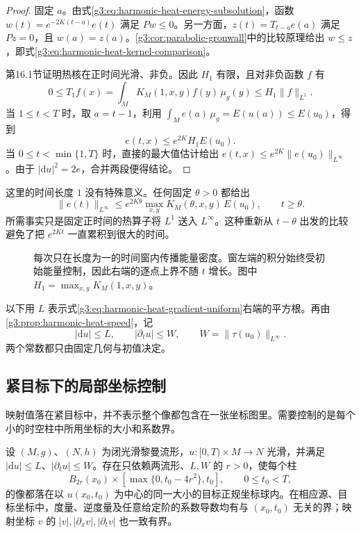 \begin{proof}
	固定 \(a\)。由式\eqref{g3:eq:harmonic-heat-energy-subsolution}，函数 \(w(t)=e^{-2K(t-a)}e(t)\) 满足 \(Pw\le0\)。另一方面，\(z(t)=T_{t-a}e(a)\) 满足 \(Pz=0\)，且 \(w(a)=z(a)\)。\cref{g3:cor:parabolic-gronwall}中的比较原理给出 \(w\le z\)，即式\eqref{g3:eq:harmonic-heat-kernel-comparison}。

	第16.1节证明热核在正时间光滑、非负。因此 \(H_1\) 有限，且对非负函数 \(f\) 有
	\[
		0\le T_1f(x)=\int_MK_M(1,x,y)f(y)\,\mu_g(y)
		\le H_1\|f\|_{L^1}.
	\]
	当 \(1\le t<T\) 时，取 \(a=t-1\)，利用 \(\int_M e(a)\,\mu_g=E(u(a))\le E(u_0)\)，得到
	\[
		e(t,x)\le e^{2K}H_1E(u_0).
	\]
	当 \(0\le t<\min\{1,T\}\) 时，直接的最大值估计给出 \(e(t,x)\le e^{2K}\|e(u_0)\|_{L^\infty}\)。由于 \(|\mathrm du|^2=2e\)，合并两段便得结论。
\end{proof}

这里的时间长度 \(1\) 没有特殊意义。任何固定 \(\theta>0\) 都给出
\[
	\|e(t)\|_{L^\infty}\le e^{2K\theta}
	\max_{x,y}K_M(\theta,x,y)\,E(u_0),\qquad t\ge\theta.
\]
所需事实只是固定正时间的热算子将 \(L^1\) 送入 \(L^\infty\)。这种重新从 \(t-\theta\) 出发的比较避免了把 \(e^{2Kt}\) 一直累积到很大的时间。

\begin{figure}[htbp]
	\centering
	
	\caption[固定时间窗内的热核比较]{每次只在长度为一的时间窗内传播能量密度。窗左端的积分始终受初始能量控制，因此右端的逐点上界不随 \(t\) 增长。图中 \(H_1=\max_{x,y}K_M(1,x,y)\)。}
	\label{g3:fig:harmonic-heat-fixed-window}
\end{figure}

以下用 \(L\) 表示式\eqref{g3:eq:harmonic-heat-gradient-uniform}右端的平方根。再由\cref{g3:prop:harmonic-heat-speed}，记
\begin{equation}\label{g3:eq:harmonic-heat-first-space-time-bounds}
	|\mathrm du|\le L,\qquad |\partial_tu|\le W,
	\qquad W=\|\tau(u_0)\|_{L^\infty}.
\end{equation}
两个常数都只由固定几何与初值决定。

\subsection{紧目标下的局部坐标控制}
\label{g3:subsec:2604:02}
映射值落在紧目标中，并不表示整个像都包含在一张坐标图里。需要控制的是每个小的时空柱中所用坐标的大小和系数界。

\begin{lemma}\label{g3:lem:harmonic-heat-uniform-charts}
	设 \((M,g)\)、\((N,h)\) 为闭光滑黎曼流形，\(u:[0,T)\times M\to N\) 光滑，并满足 \(|\mathrm du|\le L\)、\(|\partial_tu|\le W\)。存在只依赖两流形、\(L,W\) 的 \(r>0\)，使每个柱
	\[
		B_{2r}(x_0)\times[\max\{0,t_0-4r^2\},t_0],\qquad 0\le t_0<T,
	\]
	的像都落在以 \(u(x_0,t_0)\) 为中心的同一大小的目标正规坐标球内。在相应源、目标坐标中，度量、逆度量及任意给定阶的系数导数均有与 \((x_0,t_0)\) 无关的界；映射坐标 \(v\) 的 \(|v|,|\partial_xv|,|\partial_tv|\) 也一致有界。
\end{lemma}

